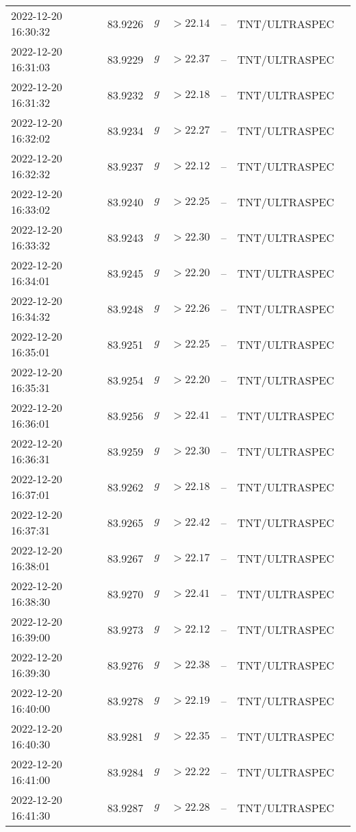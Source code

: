 \documentclass{nature_plusfigure}
\begin{document}
\begin{supplement}
\begin{center}
\begin{longtable}{lllllll}
2022-12-20 16:30:32 & 83.9226 & $g$ & $>22.14$ & -- & TNT/ULTRASPEC &  \\ 
2022-12-20 16:31:03 & 83.9229 & $g$ & $>22.37$ & -- & TNT/ULTRASPEC &  \\ 
2022-12-20 16:31:32 & 83.9232 & $g$ & $>22.18$ & -- & TNT/ULTRASPEC &  \\ 
2022-12-20 16:32:02 & 83.9234 & $g$ & $>22.27$ & -- & TNT/ULTRASPEC &  \\ 
2022-12-20 16:32:32 & 83.9237 & $g$ & $>22.12$ & -- & TNT/ULTRASPEC &  \\ 
2022-12-20 16:33:02 & 83.9240 & $g$ & $>22.25$ & -- & TNT/ULTRASPEC &  \\ 
2022-12-20 16:33:32 & 83.9243 & $g$ & $>22.30$ & -- & TNT/ULTRASPEC &  \\ 
2022-12-20 16:34:01 & 83.9245 & $g$ & $>22.20$ & -- & TNT/ULTRASPEC &  \\ 
2022-12-20 16:34:32 & 83.9248 & $g$ & $>22.26$ & -- & TNT/ULTRASPEC &  \\ 
2022-12-20 16:35:01 & 83.9251 & $g$ & $>22.25$ & -- & TNT/ULTRASPEC &  \\ 
2022-12-20 16:35:31 & 83.9254 & $g$ & $>22.20$ & -- & TNT/ULTRASPEC &  \\ 
2022-12-20 16:36:01 & 83.9256 & $g$ & $>22.41$ & -- & TNT/ULTRASPEC &  \\ 
2022-12-20 16:36:31 & 83.9259 & $g$ & $>22.30$ & -- & TNT/ULTRASPEC &  \\ 
2022-12-20 16:37:01 & 83.9262 & $g$ & $>22.18$ & -- & TNT/ULTRASPEC &  \\ 
2022-12-20 16:37:31 & 83.9265 & $g$ & $>22.42$ & -- & TNT/ULTRASPEC &  \\ 
2022-12-20 16:38:01 & 83.9267 & $g$ & $>22.17$ & -- & TNT/ULTRASPEC &  \\ 
2022-12-20 16:38:30 & 83.9270 & $g$ & $>22.41$ & -- & TNT/ULTRASPEC &  \\ 
2022-12-20 16:39:00 & 83.9273 & $g$ & $>22.12$ & -- & TNT/ULTRASPEC &  \\ 
2022-12-20 16:39:30 & 83.9276 & $g$ & $>22.38$ & -- & TNT/ULTRASPEC &  \\ 
2022-12-20 16:40:00 & 83.9278 & $g$ & $>22.19$ & -- & TNT/ULTRASPEC &  \\ 
2022-12-20 16:40:30 & 83.9281 & $g$ & $>22.35$ & -- & TNT/ULTRASPEC &  \\ 
2022-12-20 16:41:00 & 83.9284 & $g$ & $>22.22$ & -- & TNT/ULTRASPEC &  \\ 
2022-12-20 16:41:30 & 83.9287 & $g$ & $>22.28$ & -- & TNT/ULTRASPEC &  \\ 

\end{longtable}
\end{center}
\end{supplement}
\end{document}
